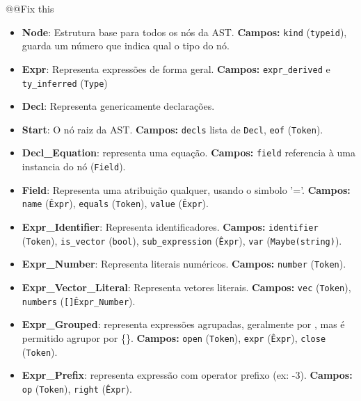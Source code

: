 @@Fix this
\begin{itemize}
\item \textbf{Node}: Estrutura base para todos os nós da AST.
      \textbf{Campos:}
      \texttt{kind} (\texttt{typeid}), guarda um número que indica qual o tipo do nó.

\item \textbf{Expr}: Representa expressões de forma geral.
      \textbf{Campos:}
      \texttt{expr\_derived} e \texttt{ty\_inferred} (\texttt{Type})

\item \textbf{Decl}: Representa genericamente declarações.

\item \textbf{Start}: O nó raiz da AST.
      \textbf{Campos:}
      \texttt{decls} lista de \texttt{Decl}, \texttt{eof} (\texttt{Token}).

\item \textbf{Decl\_Equation}: representa uma equação.
      \textbf{Campos:}
      \texttt{field} referencia à uma instancia do nó (\texttt{Field}).

\item \textbf{Field}: Representa uma atribuição qualquer, usando o simbolo '='.
      \textbf{Campos:}
      \texttt{name} (\texttt{\^Expr}), \texttt{equals} (\texttt{Token}), \texttt{value} (\texttt{\^Expr}).

\item \textbf{Expr\_Identifier}: Representa identificadores.
      \textbf{Campos:}
      \texttt{identifier} (\texttt{Token}), \texttt{is\_vector} (\texttt{bool}),
      \texttt{sub\_expression} (\texttt{\^Expr}), \texttt{var} (\texttt{Maybe(string)}).

\item \textbf{Expr\_Number}: Representa literais numéricos.
      \textbf{Campos:}
      \texttt{number} (\texttt{Token}).

\item \textbf{Expr\_Vector\_Literal}: Representa vetores literais.
      \textbf{Campos:}
      \texttt{vec} (\texttt{Token}), \texttt{numbers} (\texttt{[]\^Expr\_Number}).

  \item \textbf{Expr\_Grouped}: representa expressões agrupadas, geralmente por \(\), mas é permitido agrupor por \{\}.
      \textbf{Campos:}
      \texttt{open} (\texttt{Token}), \texttt{expr} (\texttt{\^Expr}), \texttt{close} (\texttt{Token}).

  \item \textbf{Expr\_Prefix}: representa expressão com operator prefixo (ex: -3).
      \textbf{Campos:}
      \texttt{op} (\texttt{Token}), \texttt{right} (\texttt{\^Expr}).


\end{itemize}
